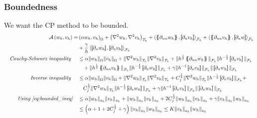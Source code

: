 \subsubsection{Boundedness}%
\label{ssub:bounded}
We want the CP method to be bounded.
\begin{equation*}
    \begin{split}
\mathcal{A} \left( w_{h}, v_{h} \right)   =& \left( \alpha w_{h}, v_{h} \right) _{\Omega } +
    \left( \nabla ^2 w_{h}, \nabla ^2v_{h} \right) _{\mathcal{T} _{h}}
  +
  \left< \mean{  \partial _{n n} w_{h} }, \jump{ \partial _{n }v_{h}} \right>_{\mathcal{F}_{h}}  +
 \left< \mean{ \partial _{n n} v_{h} }, \jump{ \partial _{n}w }      \right>_{\mathcal{F}_{h}} \\
 & + \frac{\gamma }{h}  \left< \jump{ \partial _{n} w_{h}}, \jump{ \partial _{n} v_{h}   }   \right>_{\mathcal{F}_{h}} \\
\quad \textit{Cauchy-Schwarz inequality }\quad  &\le \alpha  \|  w_{h} \|_{\Omega   }^{  } \| v_{h} \|_{ \Omega  }^{  }     +
\| \nabla ^2w_{h} \|_{\mathcal{T} _{h}   }^{  }  \| \nabla ^2v_{h} \|_{\mathcal{T} _{h}   }^{  } + \| h^{\frac{1}{2}}\mean{ \partial _{nn} w_{h} } \|_{ \mathcal{F}_{h}  }^{  } \| h^{-\frac{1}{2}}\jump{ \partial _{n} v_{h} } \|_{ \mathcal{F}_{h}  }^{  }    \\
& \quad  + \| h^{\frac{1}{2}}\mean{ \partial _{nn} v_{h} }
\|_{ \mathcal{F}_{h}  }^{  } \| h^{-\frac{1}{2}}\jump{ \partial _{n} w_{h} } \|_{ \mathcal{F}_{h}  }^{  } + \gamma \| h^{-1} \jump{ \partial _{n} v_{h}}   \|_{ \mathcal{F} _{h} }^{  }   \|  \jump{ \partial _{n} w_{h}}   \|_{ \mathcal{F} _{h} }^{  } \\
\quad \textit{Inverse inequality }\quad  &\le \alpha  \|  w_{h} \|_{\Omega   }^{  } \| v_{h} \|_{ \Omega  }^{  }  +
\| \nabla ^2w_{h} \|_{\mathcal{T} _{h}   }^{  }  \| \nabla ^2v_{h} \|_{\mathcal{T} _{h}   }^{  } + C_{j}^{\frac{1}{2}} \| \nabla ^2 w_{h} \|_{\mathcal{T} _{h}  }^{  }  \| h^{-\frac{1}{2}}\jump{ \partial _{n} v_{h} } \|_{ \mathcal{F}_{h}  }^{  }   +
 \\
& \quad  C_{j}^{\frac{1}{2}} \| \nabla ^2 w_{h} \|_{\mathcal{T} _{h}  }^{  }
 \| h^{-\frac{1}{2}}\jump{ \partial _{n} w_{h} } \|_{ \mathcal{F}_{h}  }^{  } + \gamma \| h^{-1} \jump{ \partial _{n} v_{h}}   \|_{ \mathcal{F} _{h} }^{  }   \|  \jump{ \partial _{n} w_{h}}   \|_{ \mathcal{F} _{h} }^{  } \\
\textit{ Using \eqref{eq:bounded_ineq}}  \quad & \le\alpha  \|  w_{h} \|_{a_{h}   }^{  } \| v_{h} \|_{ a_{h}   }^{  } + \| w_{h} \|_{ a_{h} }^{  } \| v_{h} \|_{ a_{h} }^{  }  + 2C_{j}^{\frac{1}{2}} \| w_{h} \|_{ a_{h} }^{  } \| v_{h} \|_{ a_{h} }^{  } + \gamma \| v_{h} \|_{ a_{h} }^{  } \| w_{h} \|_{ a_{h} }^{  } \\
& \le  \left( \alpha + 1 + 2C_{j}^{\frac{1}{2}} + \gamma  \right)  \| v_{h} \|_{a_{h}  }^{  }  \| w_{h} \|_{ a_{h} }^{  }  \le  K  \| v_{h} \|_{a_{h}  }^{  }  \| w_{h} \|_{ a_{h} }^{  }
\end{split}
\end{equation*}

